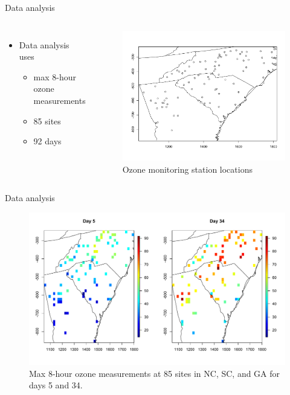 \documentclass{beamer}
\begin{document}
\begin{frame}{Data analysis}
\begin{columns}[c]
	\begin{itemize} \setlength{\itemsep}{0.5em}
	\item Data analysis uses
	\begin{itemize}
		\item max 8-hour ozone measurements
		\item 85 sites
		\item 92 days
	\end{itemize}
	\end{itemize}
	
	\begin{figure}
    \includegraphics[width=1\linewidth]{./plots/ozone_station.pdf}
    \caption{Ozone monitoring station locations}
    \end{figure}
\end{columns}
\end{frame}

\begin{frame}{Data analysis}
  \centering
  \begin{figure}
    \includegraphics[width=1\linewidth]{./plots/ozone-day.pdf}
    \caption{Max 8-hour ozone measurements at 85 sites in NC, SC, and GA for days 5 and 34.}
   \end{figure}

\end{frame}
\end{document}
